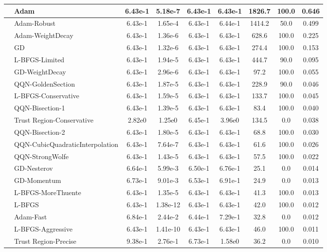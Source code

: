 \documentclass{article}
\begin{document}
\begin{longtable}{|l|l|c|c|c|c|c|c|c|}
\hline
 & Adam & 6.43e-1 & 5.18e-7 & 6.43e-1 & 6.43e-1 & 1826.7 & 100.0 & 0.646 \\
\hline
 & Adam-Robust & 6.43e-1 & 1.65e-4 & 6.43e-1 & 6.44e-1 & 1414.2 & 50.0 & 0.499 \\
\hline
 & Adam-WeightDecay & 6.43e-1 & 1.36e-6 & 6.43e-1 & 6.43e-1 & 628.6 & 100.0 & 0.225 \\
\hline
 & GD & 6.43e-1 & 1.32e-6 & 6.43e-1 & 6.43e-1 & 274.4 & 100.0 & 0.153 \\
\hline
 & L-BFGS-Limited & 6.43e-1 & 1.94e-5 & 6.43e-1 & 6.43e-1 & 444.7 & 90.0 & 0.095 \\
\hline
 & GD-WeightDecay & 6.43e-1 & 2.96e-6 & 6.43e-1 & 6.43e-1 & 97.2 & 100.0 & 0.055 \\
\hline
 & QQN-GoldenSection & 6.43e-1 & 1.87e-5 & 6.43e-1 & 6.43e-1 & 228.9 & 90.0 & 0.046 \\
\hline
 & L-BFGS-Conservative & 6.43e-1 & 1.59e-5 & 6.43e-1 & 6.43e-1 & 133.7 & 100.0 & 0.045 \\
\hline
 & QQN-Bisection-1 & 6.43e-1 & 1.39e-5 & 6.43e-1 & 6.43e-1 & 83.4 & 100.0 & 0.040 \\
\hline
 & Trust Region-Conservative & 2.82e0 & 1.25e0 & 6.45e-1 & 3.96e0 & 134.5 & 0.0 & 0.038 \\
\hline
 & QQN-Bisection-2 & 6.43e-1 & 1.80e-5 & 6.43e-1 & 6.43e-1 & 68.8 & 100.0 & 0.030 \\
\hline
 & QQN-CubicQuadraticInterpolation & 6.43e-1 & 7.64e-7 & 6.43e-1 & 6.43e-1 & 61.6 & 100.0 & 0.026 \\
\hline
 & QQN-StrongWolfe & 6.43e-1 & 1.43e-5 & 6.43e-1 & 6.43e-1 & 57.5 & 100.0 & 0.022 \\
\hline
 & GD-Nesterov & 6.64e-1 & 5.99e-3 & 6.50e-1 & 6.76e-1 & 25.1 & 0.0 & 0.014 \\
\hline
 & GD-Momentum & 6.73e-1 & 9.01e-3 & 6.53e-1 & 6.91e-1 & 24.9 & 0.0 & 0.013 \\
\hline
 & L-BFGS-MoreThuente & 6.43e-1 & 1.35e-5 & 6.43e-1 & 6.43e-1 & 41.3 & 100.0 & 0.013 \\
\hline
 & L-BFGS & 6.43e-1 & 1.38e-12 & 6.43e-1 & 6.43e-1 & 42.0 & 100.0 & 0.012 \\
\hline
 & Adam-Fast & 6.84e-1 & 2.44e-2 & 6.44e-1 & 7.29e-1 & 32.8 & 0.0 & 0.012 \\
\hline
 & L-BFGS-Aggressive & 6.43e-1 & 1.41e-10 & 6.43e-1 & 6.43e-1 & 46.0 & 100.0 & 0.011 \\
\hline
 & Trust Region-Precise & 9.38e-1 & 2.76e-1 & 6.73e-1 & 1.58e0 & 36.2 & 0.0 & 0.010 \\

\end{longtable}
\end{document}
